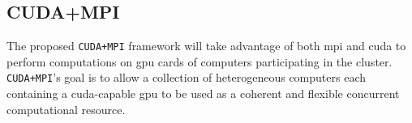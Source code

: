 \subsection{CUDA+MPI}

The proposed \texttt{CUDA+MPI} framework will take advantage of both \gls{mpi}
and \gls{cuda} to perform computations on \gls{gpu} cards of computers
participating in the cluster. \texttt{CUDA+MPI}'s goal is to allow a collection
of heterogeneous computers each containing a \gls{cuda}-capable \gls{gpu} to be
used as a coherent and flexible concurrent computational resource.
